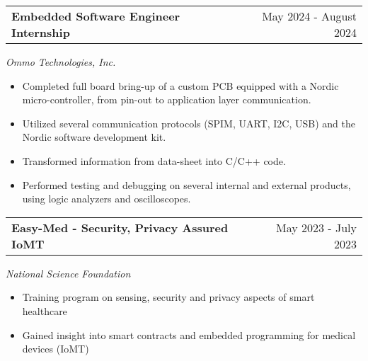 \documentclass[a4paper,12pt]{article}
\begin{document}
\begin{tabularx}{\linewidth}{@{}Xr@{}}
\textbf{Embedded Software Engineer Internship} & \hfill May 2024 - August 2024
\end{tabularx}
\textit{Ommo Technologies, Inc.}
\begin{itemize}[leftmargin=*, nosep]
    \item Completed full board bring-up of a custom PCB equipped with a Nordic micro-controller, from pin-out to application layer communication.
    \item Utilized several communication protocols (SPIM, UART, I2C, USB) and the Nordic software development kit.
    \item Transformed information from data-sheet into C/C++ code.
    \item Performed testing and debugging on several internal and external products, using logic analyzers and oscilloscopes.
\end{itemize}

\begin{tabularx}{\linewidth}{@{}Xr@{}}
\textbf{Easy-Med - Security, Privacy Assured IoMT} & \hfill May 2023 - July 2023
\end{tabularx}
\textit{National Science Foundation}
\begin{itemize}[leftmargin=*, nosep]
    \item Training program on sensing, security and privacy aspects of smart healthcare
    \item Gained insight into smart contracts and embedded programming for medical devices (IoMT)
\end{itemize}

\vfill
\end{document}
